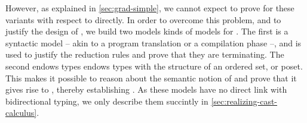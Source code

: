 However, as explained in \cref{sec:grad-simple}, we cannot expect to prove 
for these  variants with respect to  directly.
In order to overcome this problem, and to justify the design of ,
we build two models kinds of models for . The first%
 is a syntactic model
 – akin to a program translation or a compilation phase –,
and is used to justify the reduction rules and prove that they are terminating.
The second%
endows types endows types with the structure of an ordered set, or poset. This makes it
possible to reason about the semantic notion of  and prove that it gives rise to ,
thereby establishing .
%
As these models have no direct link with bidirectional typing, we only describe them
succintly in \cref{sec:realizing-cast-calculus}.